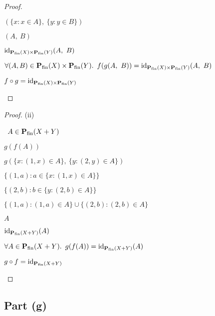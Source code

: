 \begin{prop}
\begin{proof}
\begin{itemize}
\begin{itemize}
          \step[=]
            $(\{x : x\in A\},~\{y : y\in B\})$

          \step[=]
            $(A,~B)$

          \step[=]
            $\operatorname{id}_{\mathbf{P}_{\operatorname{fin}}(X)\times\mathbf{P}_{\operatorname{fin}}(Y)}(A,~B)$
        \end{itemize}
        \step[\imps]
          $\forall (A, B)\in\mathbf{P}_{\operatorname{fin}}(X)\times\mathbf{P}_{\operatorname{fin}}(Y)\ldotp~f(g(A,~B)) = \operatorname{id}_{\mathbf{P}_{\operatorname{fin}}(X)\times\mathbf{P}_{\operatorname{fin}}(Y)}(A,~B)$
          \marginnote{$\forall$-\Intro}

        \step[\imps]
          $f\circ g = \operatorname{id}_{\mathbf{P}_{\operatorname{fin}}(X)\times\mathbf{P}_{\operatorname{fin}}(Y)}$
          \qedhere
          \marginnote{\Def-$=$}
    \end{itemize}
  \end{proof}

  \begin{proof} (ii)
    \begin{itemize}
      \step
        \begin{itemize}
          \subp{\star}
            \Let~$A\in\mathbf{P}_{\operatorname{fin}}(X+Y)$

          \step $g(f(A))$

          \step[=]
            $g(\{x:(1,x)\in A\},~\{y:(2,y)\in A\})$

          \step[=]
            $\{(1,a) : a\in\{x : (1,x)\in A\}\}$

          \step[\cup]
            $\{(2,b) : b\in\{y : (2,b)\in A\}\}$

          \step[=]
            $\{(1,a) : (1,a)\in A\}\cup\{(2,b):(2,b)\in A\}$

          \step[=]
            $A$

          \step[=]
            $\operatorname{id}_{\mathbf{P}_{\operatorname{fin}}(X + Y)}(A)$
        \end{itemize}

      \step[\imps]
        $\forall A\in\mathbf{P}_{\operatorname{fin}}(X+Y)\ldotp~g(f(A)) = \operatorname{id}_{\mathbf{P}_{\operatorname{fin}}(X+Y)}(A)$
        \marginnote{$\forall$-\Intro}

      \step[\imps]
        $g\circ f = \operatorname{id}_{\mathbf{P}_{\operatorname{fin}}(X+Y)}$
        \qedhere
        \marginnote{\Def-$=$}
    \end{itemize}
  \end{proof}
\end{prop}

\subsection{Part (g)}\label{sec:q-2-g}

